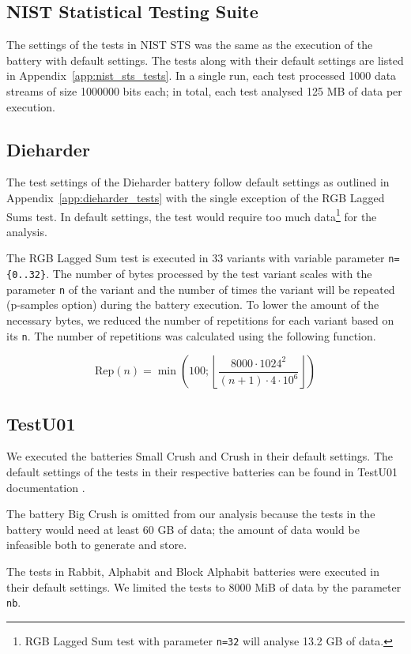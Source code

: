 \documentclass[
  digital,  	%
  color,		%
  oneside,   	%
  12pt,
  nocover,
  notable,
  nolof,
  nolot,
]{fithesis3}
\theoremstyle{definition}
\theoremstyle{remark}
\begin{document}
\subsection*{NIST Statistical Testing Suite}
The settings of the tests in NIST STS was the same as the execution of the battery with default settings. The tests along with their default settings are listed in Appendix~\ref{app:nist_sts_tests}. In a single run, each test processed 1000 data streams of size 1000000 bits each; in total, each test analysed 125 MB of data per execution.

\subsection*{Dieharder}
The test settings of the Dieharder battery follow default settings as outlined in Appendix~\ref{app:dieharder_tests} with the single exception of the RGB Lagged Sums test. In default settings, the test would require too much data\footnote{RGB Lagged Sum test with parameter \texttt{n=32} will analyse 13.2 GB of data.} for the analysis. 

The RGB Lagged Sum test is executed in 33 variants with variable parameter \texttt{n=\{0..32\}}. The number of bytes processed by the test variant scales with the parameter \texttt{n} of the variant and the number of times the variant will be repeated (p-samples option) during the battery execution. To lower the amount of the necessary bytes, we reduced the number of repetitions for each variant based on its \texttt{n}. The number of repetitions was calculated using the following function.

$$
\text{Rep}(n) = \min\left(100 ; \left\lfloor \frac{ 8000 \cdot 1024^{2} }{ (n + 1) \cdot 4 \cdot 10^{6} } \right\rfloor \right)
$$

\subsection*{TestU01}
We executed the batteries Small Crush and Crush in their default settings. The default settings of the tests in their respective batteries can be found in TestU01 documentation \cite[p.~143]{testu01-documentation}.

The battery Big Crush is omitted from our analysis because the tests in the battery would need at least 60 GB of data; the amount of data would be infeasible both to generate and store.

The tests in Rabbit, Alphabit and Block Alphabit batteries were executed in their default settings. We limited the tests to 8000 MiB of data by the parameter \texttt{nb}.
\end{document}
